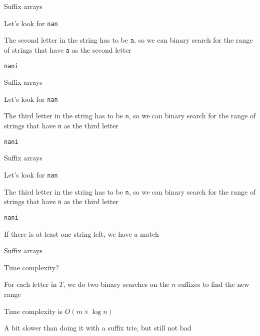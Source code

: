 \begin{frame}[fragile]{Suffix arrays}
    \bi
\item Let's look for \texttt{nan}
\item The second letter in the string has to be \texttt{a}, so we can binary search for the range of strings that have \texttt{a} as the second letter
    \ei
    \vspace{10pt}
    \begin{verbatim}
nani
    \end{verbatim}
\end{frame}

\begin{frame}[fragile]{Suffix arrays}
    \bi
\item Let's look for \texttt{nan}
\item The third letter in the string has to be \texttt{n}, so we can binary search for the range of strings that have \texttt{n} as the third letter
    \ei
    \vspace{10pt}
    \begin{verbatim}
nani
    \end{verbatim}
\end{frame}

\begin{frame}[fragile]{Suffix arrays}
    \bi
\item Let's look for \texttt{nan}
\item The third letter in the string has to be \texttt{n}, so we can binary search for the range of strings that have \texttt{n} as the third letter
    \ei
    \vspace{10pt}
    \begin{verbatim}
nani
    \end{verbatim}
    \bi
\item<2-> If there is at least one string left, we have a match
    \ei
\end{frame}

\begin{frame}{Suffix arrays}
    \bi
        \item Time complexity?
            \vspace{5pt}
        \item For each letter in $T$, we do two binary searches on the $n$ suffixes to find the new range
        \item Time complexity is $O(m \times \log n)$
            \vspace{10pt}
        \item A bit slower than doing it with a suffix trie, but still not bad
    \ei
\end{frame}

